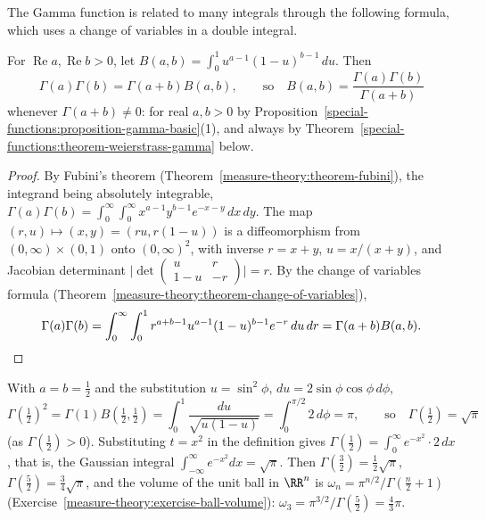 The Gamma function is related to many integrals through the following formula, which uses a change of variables in a double integral.

\begin{proposition}\label{special-functions:proposition-beta}
For $\operatorname{Re}a, \operatorname{Re}b > 0$, let $B(a, b) = \int_0^1u^{a-1}(1 - u)^{b-1}\,du$. Then
\[
\Gamma(a)\Gamma(b) = \Gamma(a + b)B(a, b), \qquad \text{so} \quad B(a, b) = \frac{\Gamma(a)\Gamma(b)}{\Gamma(a + b)}
\]
whenever $\Gamma(a + b) \neq 0$: for real $a, b > 0$ by Proposition~\ref{special-functions:proposition-gamma-basic}(1), and always by Theorem~\ref{special-functions:theorem-weierstrass-gamma} below.
\end{proposition}

\begin{proof}
By Fubini's theorem (Theorem~\ref{measure-theory:theorem-fubini}), the integrand being absolutely integrable,
$\Gamma(a)\Gamma(b) = \int_0^\infty\int_0^\infty x^{a-1}y^{b-1}e^{-x-y}\,dx\,dy$. The map $(r, u) \mapsto (x, y) = (ru, r(1 - u))$ is a diffeomorphism from $(0, \infty) \times (0, 1)$ onto
$(0, \infty)^2$, with inverse $r = x + y$, $u = x/(x + y)$, and Jacobian determinant $\bigl|\det\begin{pmatrix}u & r \\ 1 - u & -r\end{pmatrix}\bigr| = r$. By the change of variables formula
(Theorem~\ref{measure-theory:theorem-change-of-variables}),
\[
\Gamma(a)\Gamma(b) = \int_0^\infty\int_0^1r^{a+b-1}u^{a-1}(1 - u)^{b-1}e^{-r}\,du\,dr = \Gamma(a + b)B(a, b). \qedhere
\]
\end{proof}

\begin{example}\label{special-functions:example-gamma-half}
With $a = b = \frac12$ and the substitution $u = \sin^2\phi$, $du = 2\sin\phi\cos\phi\,d\phi$,
\[
\Gamma(\tfrac12)^2 = \Gamma(1)B(\tfrac12, \tfrac12) = \int_0^1\frac{du}{\sqrt{u(1 - u)}} = \int_0^{\pi/2}2\,d\phi = \pi, \qquad \text{so} \quad \Gamma(\tfrac12) = \sqrt{\pi}
\]
(as $\Gamma(\frac12) > 0$). Substituting $t = x^2$ in the definition gives $\Gamma(\frac12) = \int_0^\infty e^{-x^2}\cdot 2\,dx$, that is, the Gaussian integral $\int_{-\infty}^\infty e^{-x^2}dx = \sqrt{\pi}$. Then
$\Gamma(\frac32) = \frac12\sqrt{\pi}$, $\Gamma(\frac52) = \frac34\sqrt{\pi}$, and the volume of the unit ball in $\RR^n$ is $\omega_n = \pi^{n/2}/\Gamma(\frac n2 + 1)$
(Exercise~\ref{measure-theory:exercise-ball-volume}): $\omega_3 = \pi^{3/2}/\Gamma(\frac52) = \frac43\pi$.
\end{example}

